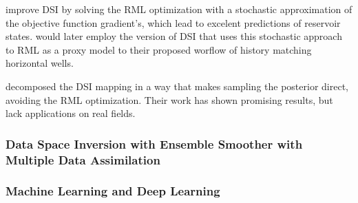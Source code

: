      improve DSI by solving the RML optimization with
    a stochastic approximation of the objective function gradient's, 
    which lead to excelent predictions of reservoir states.
     would later employ the version of DSI that uses this stochastic approach to RML
    as a proxy model to their proposed worflow of history matching horizontal wells.  
    
     decomposed the DSI mapping 
    in a way that makes sampling the posterior direct, avoiding the RML optimization. 
    Their work has shown promising results, but lack applications on real fields.
    
\subsubsection{Data Space Inversion with Ensemble Smoother with Multiple Data Assimilation}

\subsubsection{Machine Learning and Deep Learning}

